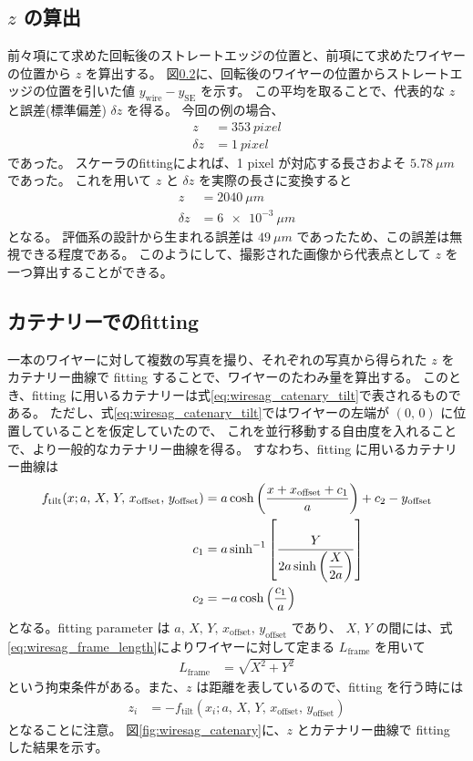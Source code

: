 \documentclass[../../main.tex]{subfiles}
\begin{document}
\subsection{$z$ の算出}
前々項にて求めた回転後のストレートエッジの位置と、前項にて求めたワイヤーの位置から $z$ を算出する。
図\ref{}に、回転後のワイヤーの位置からストレートエッジの位置を引いた値 $y_{\mathrm{wire}}-y_{\mathrm{SE}}$ を示す。
この平均を取ることで、代表的な $z$ と誤差(標準偏差) $\delta z$ を得る。
今回の例の場合、
\begin{align}
    z &= \SI{353}{pixel} \\
    \delta z &= \SI{1}{pixel}
\end{align}
であった。
スケーラのfittingによれば、1 pixel が対応する長さおよそ $\SI{5.78}{\mu m}$ であった。
これを用いて $z$ と $\delta z$ を実際の長さに変換すると
\begin{align}
    z &= \SI{2040}{\mu m} \\
    \delta z &= \SI{6e-3}{\mu m}
\end{align}
となる。
評価系の設計から生まれる誤差は $\SI{49}{\mu m}$ であったため、この誤差は無視できる程度である。
このようにして、撮影された画像から代表点として $z$ を一つ算出することができる。
\subsection{カテナリーでのfitting}
一本のワイヤーに対して複数の写真を撮り、それぞれの写真から得られた $z$ をカテナリー曲線で fitting することで、ワイヤーのたわみ量を算出する。
このとき、fitting に用いるカテナリーは式\eqref{eq:wiresag_catenary_tilt}で表されるものである。
ただし、式\eqref{eq:wiresag_catenary_tilt}ではワイヤーの左端が $(0,\,0)$ に位置していることを仮定していたので、
これを並行移動する自由度を入れることで、より一般的なカテナリー曲線を得る。
すなわち、fitting に用いるカテナリー曲線は
\begin{align}
    f_{\mathrm{tilt}}(x;a,\,X,\,Y,\,x_{\mathrm{offset}},\,y_{\mathrm{offset}}) &= a\cosh\qty(\dfrac{x+x_{\mathrm{offset}}+c_1}{a}) + c_2 - y_{\mathrm{offset}}\\
    c_1 &= a\sinh^{-1}\qty[\dfrac{Y}{2a\sinh\qty(\dfrac{X}{2a})}] \\
    c_2 &= -a\cosh\qty(\dfrac{c_1}{a})
\end{align}
となる。fitting parameter は $a,\,X,\,Y,\,x_{\mathrm{offset}},\,y_{\mathrm{offset}}$ であり、
$X,\,Y$ の間には、式\eqref{eq:wiresag_frame_length}によりワイヤーに対して定まる $L_{\mathrm{frame}}$ を用いて
\begin{align}
    L_{\mathrm{frame}} &= \sqrt{X^2+Y^2}
\end{align}
という拘束条件がある。また、$z$ は距離を表しているので、fitting を行う時には
\begin{align}
    z_{i} &= -f_{\mathrm{tilt}}(x_{i};a,\,X,\,Y,\,x_{\mathrm{offset}},\,y_{\mathrm{offset}})
\end{align}
となることに注意。
図\ref{fig:wiresag_catenary}に、$z$ とカテナリー曲線で fitting した結果を示す。
\end{document}
